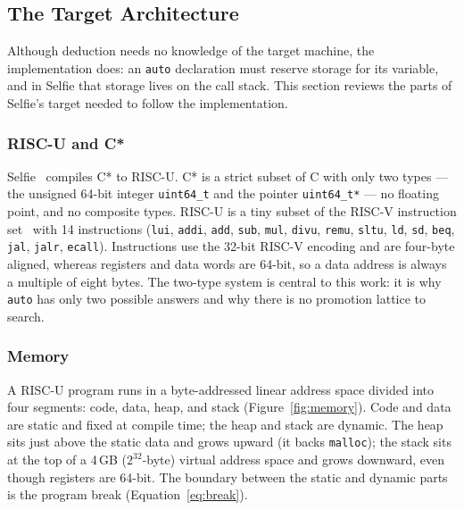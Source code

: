 \documentclass[a4paper,11pt]{article}
\begin{document}
\subsection{The Target Architecture}
\label{sec:architecture}

Although deduction needs no knowledge of the target machine, the implementation does: an \texttt{auto} declaration must reserve storage for its variable, and in Selfie that storage lives on the call stack. This section reviews the parts of Selfie's target needed to follow the implementation.

\subsubsection{RISC-U and C*}
\label{sec:riscu}

Selfie~\cite{selfie} compiles C* to RISC-U. C* is a strict subset of C with only two types --- the unsigned 64-bit integer \texttt{uint64\_t} and the pointer \texttt{uint64\_t*} --- no floating point, and no composite types. RISC-U is a tiny subset of the RISC-V instruction set~\cite{riscv} with 14 instructions (\texttt{lui}, \texttt{addi}, \texttt{add}, \texttt{sub}, \texttt{mul}, \texttt{divu}, \texttt{remu}, \texttt{sltu}, \texttt{ld}, \texttt{sd}, \texttt{beq}, \texttt{jal}, \texttt{jalr}, \texttt{ecall}). Instructions use the 32-bit RISC-V encoding and are four-byte aligned, whereas registers and data words are 64-bit, so a data address is always a multiple of eight bytes. The two-type system is central to this work: it is why \texttt{auto} has only two possible answers and why there is no promotion lattice to search.

\subsubsection{Memory}
\label{sec:memory}

A RISC-U program runs in a byte-addressed linear address space divided into four segments: code, data, heap, and stack (Figure~\ref{fig:memory}). Code and data are static and fixed at compile time; the heap and stack are dynamic. The heap sits just above the static data and grows upward (it backs \texttt{malloc}); the stack sits at the top of a 4\,GB ($2^{32}$-byte) virtual address space and grows downward, even though registers are 64-bit. The boundary between the static and dynamic parts is the program break (Equation~\ref{eq:break}).
\end{document}
